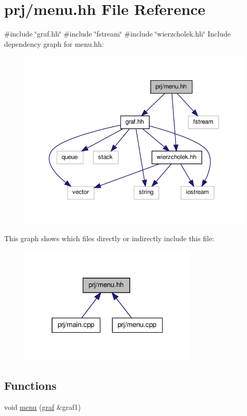 \hypertarget{menu_8hh}{\section{prj/menu.hh \-File \-Reference}
\label{menu_8hh}
}
{\ttfamily \#include \char`\"{}graf.\-hh\char`\"{}}\*
{\ttfamily \#include \char`\"{}fstream\char`\"{}}\*
{\ttfamily \#include \char`\"{}wierzcholek.\-hh\char`\"{}}\*
\-Include dependency graph for menu.\-hh\-:
\nopagebreak
\begin{figure}[H]
\begin{center}
\leavevmode
\includegraphics[width=350pt]{menu_8hh__incl}
\end{center}
\end{figure}
\-This graph shows which files directly or indirectly include this file\-:
\nopagebreak
\begin{figure}[H]
\begin{center}
\leavevmode
\includegraphics[width=240pt]{menu_8hh__dep__incl}
\end{center}
\end{figure}
\subsection*{\-Functions}
\begin{DoxyCompactItemize}
\item 
void \hyperlink{menu_8hh_aacc433e415d518c27882997e60a20fe8}{menu} (\hyperlink{classgraf}{graf} \&graf1)
\end{DoxyCompactItemize}


